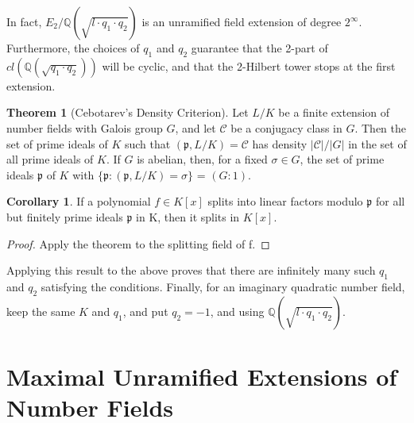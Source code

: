 \documentclass[12pt]{extarticle}
\newcommand{\Q}{\mathbb{Q}}
\newcommand{\<}{\langle}
\renewcommand{\>}{\rangle}
\theoremstyle{definition}
\newtheorem{theorem}{Theorem}
\newtheorem{corollary}{Corollary}
\begin{document}
\begin{center}
\end{center}
In fact, $E_2/\Q(\sqrt{l \cdot q_1 \cdot q_2})$ is an unramified field extension of degree $2^{\infty}$. Furthermore, the choices of $q_1$ and $q_2$ guarantee that the 2-part of $cl(\Q(\sqrt{q_1 \cdot q_2}))$ will be cyclic, and that the 2-Hilbert tower stops at the first extension. 


\begin{theorem}[Cebotarev's Density Criterion]
Let $L/K$ be a finite extension of
number fields with Galois group $G$, and let $\mathcal{C}$ be a conjugacy class in $G$. Then the set of
prime ideals of $K$ such that $(\mathfrak{p},L/K)=\mathcal{C}$ has density $|\mathcal{C}|/|G|$ in the set of all prime
ideals of $K$. If $G$ is abelian, then, for a fixed $\sigma \in G$, the set of prime ideals $\mathfrak{p}$ of $K$ with $\{\mathfrak{p}:(\mathfrak{p},L/K)=\sigma\}$  = $(G:1)$.
\end{theorem}
\begin{corollary}
 If a polynomial $f \in K[x]$ splits into linear factors modulo $\mathfrak{p}$ for all but finitely prime ideals $\mathfrak{p}$ in K, then it splits in $K[x]$.
\end{corollary}
\begin{proof}
Apply the theorem to the splitting field of f.
\end{proof}
Applying this result to the above proves that there are infinitely many such $q_1$ and $q_2$ satisfying the conditions.
Finally, for an imaginary quadratic number field, keep the same $K$ and $q_1$, and put $q_2=-1$, and using $\Q(\sqrt{l \cdot q_1 \cdot q_2})$. 




\section{Maximal Unramified Extensions of Number Fields}
\end{document}
